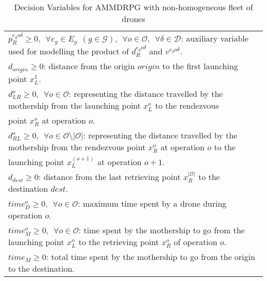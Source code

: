 \begin{table}[h!]
\begin{tabular}{|l|}
$p_R^{e_go\delta} \geq 0, \:\: \forall e_g \in E_g\:\: (g \in \mathcal{G}), \:\:\forall o \in \mathcal O, \:\:\forall \delta\in\mathcal D$: auxiliary variable used for modelling the product of $d_R^{e_go\delta}$ and $v^{e_go\delta}$.\\
$d_{origin}\geq 0$: distance from the origin $origin$ to the first launching point $x_L^1$.\\
$d_{LR}^o \geq 0, \:\: \forall o \in \mathcal O$: representing the distance travelled by the mothership from the launching point $x_L^o$ to the rendezvous\\
\hspace*{1cm}   point $x_R^o$ at operation $o$.\\
$d_{RL}^o \geq 0, \:\: \forall o \in \mathcal O\setminus|\mathcal O|$: representing the distance travelled by the mothership from the rendezvous point $x_R^o$ at operation $o$ to the \\ 
\hspace*{1cm}  launching point $x_L^{(o+1)}$ at operation $o+1$.\\
$d_{dest}\geq 0$: distance from the last retrieving point $x_R^{|\mathcal O|}$ to the destination $dest$.\\
$time_D^o \geq 0, \:\: \forall o \in \mathcal O$: maximum time spent by a drone during operation $o$.\\
$time_M^o \geq 0, \:\: \forall o \in \mathcal O$: time spent by the mothership to go from the launching point $x_L^o$ to the retrieving point $x_R^o$ of operation $o$.\\
$time_M \geq 0$: total time spent by the mothership to go from the origin to the destination.\\
\hline
\end{tabular}
\caption{Decision Variables for AMMDRPG with non-homogeneous fleet of drones}
\label{table:At2}
\end{table}

